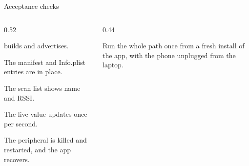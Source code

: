 \documentclass[10pt,aspectratio=169,t]{beamer}
\begin{document}
\begin{frame}[eyebrow=Acceptance]{Acceptance checks}
  \vskip 2mm
  \begin{columns}[T]
    \begin{column}{0.52\textwidth}
      \begin{checklist}
        \item {} builds and advertises.
        \item The manifest and Info.plist entries are in place.
        \item The scan list shows name and RSSI.
        \item The live value updates once per second.
        \item The peripheral is killed and restarted, and the app recovers.
      \end{checklist}
    \end{column}
    \begin{column}{0.44\textwidth}
      \vskip 2mm
      \begin{hint}
        Run the whole path once from a fresh install of the app, with the phone unplugged from the laptop.
      \end{hint}
    \end{column}
  \end{columns}
\end{frame}

\end{document}

